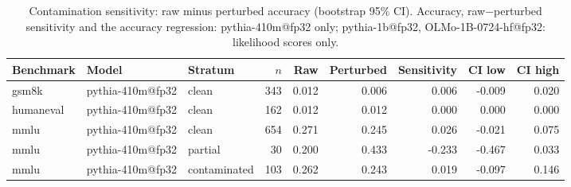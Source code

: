 \begin{table}[t]
\centering
\caption{Contamination sensitivity: raw minus perturbed accuracy (bootstrap 95\% CI). Accuracy, raw$-$perturbed sensitivity and the accuracy regression: pythia-410m@fp32 only; pythia-1b@fp32, OLMo-1B-0724-hf@fp32: likelihood scores only. }
\label{tab:sensitivity}
\begin{tabular}{lllrrrrrr}
\toprule
Benchmark & Model & Stratum & $n$ & Raw & Perturbed & Sensitivity & CI low & CI high \\
\midrule
gsm8k & pythia-410m@fp32 & clean & 343 & 0.012 & 0.006 & 0.006 & -0.009 & 0.020 \\
\midrule
humaneval & pythia-410m@fp32 & clean & 162 & 0.012 & 0.012 & 0.000 & 0.000 & 0.000 \\
\midrule
mmlu & pythia-410m@fp32 & clean & 654 & 0.271 & 0.245 & 0.026 & -0.021 & 0.075 \\
mmlu & pythia-410m@fp32 & partial & 30 & 0.200 & 0.433 & -0.233 & -0.467 & 0.033 \\
mmlu & pythia-410m@fp32 & contaminated & 103 & 0.262 & 0.243 & 0.019 & -0.097 & 0.146 \\
\bottomrule
\end{tabular}
\end{table}

